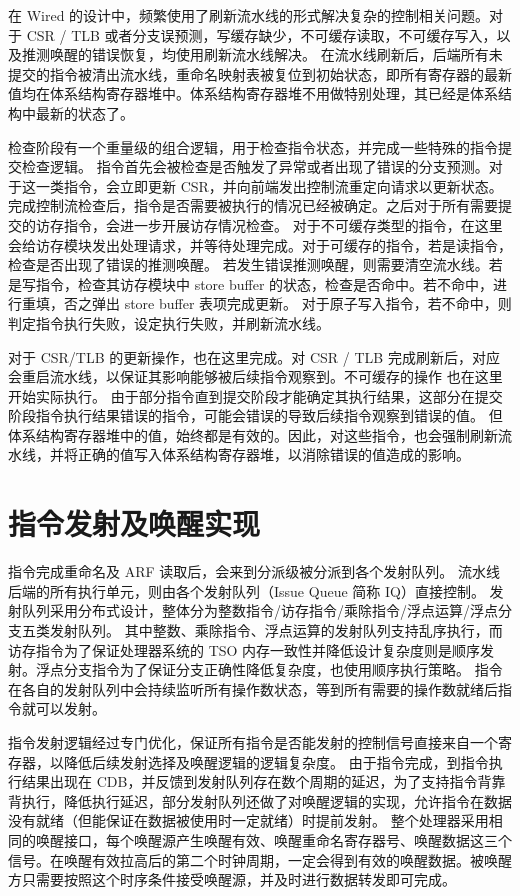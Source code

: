 在 Wired 的设计中，频繁使用了刷新流水线的形式解决复杂的控制相关问题。对于 CSR / TLB 或者分支误预测，写缓存缺少，不可缓存读取，不可缓存写入，以及推测唤醒的错误恢复，均使用刷新流水线解决。 在流水线刷新后，后端所有未提交的指令被清出流水线，重命名映射表被复位到初始状态，即所有寄存器的最新值均在体系结构寄存器堆中。体系结构寄存器堆不用做特别处理，其已经是体系结构中最新的状态了。

检查阶段有一个重量级的组合逻辑，用于检查指令状态，并完成一些特殊的指令提交检查逻辑。 指令首先会被检查是否触发了异常或者出现了错误的分支预测。对于这一类指令，会立即更新 CSR，并向前端发出控制流重定向请求以更新状态。 完成控制流检查后，指令是否需要被执行的情况已经被确定。之后对于所有需要提交的访存指令，会进一步开展访存情况检查。 对于不可缓存类型的指令，在这里会给访存模块发出处理请求，并等待处理完成。对于可缓存的指令，若是读指令，检查是否出现了错误的推测唤醒。 若发生错误推测唤醒，则需要清空流水线。若是写指令，检查其访存模块中 store buffer 的状态，检查是否命中。若不命中，进行重填，否之弹出 store buffer 表项完成更新。 对于原子写入指令，若不命中，则判定指令执行失败，设定执行失败，并刷新流水线。

对于 CSR/TLB 的更新操作，也在这里完成。对 CSR / TLB 完成刷新后，对应会重启流水线，以保证其影响能够被后续指令观察到。不可缓存的操作 也在这里开始实际执行。 由于部分指令直到提交阶段才能确定其执行结果，这部分在提交阶段指令执行结果错误的指令，可能会错误的导致后续指令观察到错误的值。 但体系结构寄存器堆中的值，始终都是有效的。因此，对这些指令，也会强制刷新流水线，并将正确的值写入体系结构寄存器堆，以消除错误的值造成的影响。

\section{指令发射及唤醒实现}\label{sec:05-complex-cpu-012}

指令完成重命名及 ARF 读取后，会来到分派级被分派到各个发射队列。 流水线后端的所有执行单元，则由各个发射队列（Issue Queue 简称 IQ）直接控制。 发射队列采用分布式设计，整体分为整数指令/访存指令/乘除指令/浮点运算/浮点分支五类发射队列。 其中整数、乘除指令、浮点运算的发射队列支持乱序执行，而访存指令为了保证处理器系统的 TSO 内存一致性并降低设计复杂度则是顺序发射。浮点分支指令为了保证分支正确性降低复杂度，也使用顺序执行策略。 指令在各自的发射队列中会持续监听所有操作数状态，等到所有需要的操作数就绪后指令就可以发射。

指令发射逻辑经过专门优化，保证所有指令是否能发射的控制信号直接来自一个寄存器，以降低后续发射选择及唤醒逻辑的逻辑复杂度。 由于指令完成，到指令执行结果出现在 CDB，并反馈到发射队列存在数个周期的延迟，为了支持指令背靠背执行，降低执行延迟，部分发射队列还做了对唤醒逻辑的实现，允许指令在数据没有就绪（但能保证在数据被使用时一定就绪）时提前发射。 整个处理器采用相同的唤醒接口，每个唤醒源产生唤醒有效、唤醒重命名寄存器号、唤醒数据这三个信号。在唤醒有效拉高后的第二个时钟周期，一定会得到有效的唤醒数据。被唤醒方只需要按照这个时序条件接受唤醒源，并及时进行数据转发即可完成。

